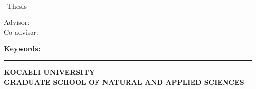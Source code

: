     \chapter*{\listtables}
    \renewcommand\listtablename{\vspace{-3.2em}}
    
    \listoftables
\fi

\ifmaps
    \newpage
    \setlength{\cftfigindent}{0pt}
    \renewcommand{\cftfigpresnum}{\mapName\enspace}
    \renewcommand{\cftfigaftersnum}{}
    \setlength{\cftfignumwidth}{\tempp}
    \settowidth{\mylen}{\cftfigpresnum\cftfigaftersnum}
    \addtolength{\cftfignumwidth}{\mylen}
    \listofmaps
\fi


\ifnum{}
\ifnum{}
\newpage
\chapter*{\eabstract}

\begin{center}
{\bfseries \Large\titleEN}

\student

\departmentEN \\ {\degree~Thesis}

Advisor: \advisorEN \\
\ifnum{}
Co-advisor: \coadvisorEN
\fi  


\end{center}

\abstractTextEnglish

{\bfseries Keywords:} \abstractKeywordsEnglish

\vfill


\begin{center}
\rule{0.8\textwidth}{.1pt}

\bfseries \small
 KOCAELI UNIVERSITY\\
 GRADUATE SCHOOL OF NATURAL AND APPLIED SCIENCES
\end{center}

\newpage
